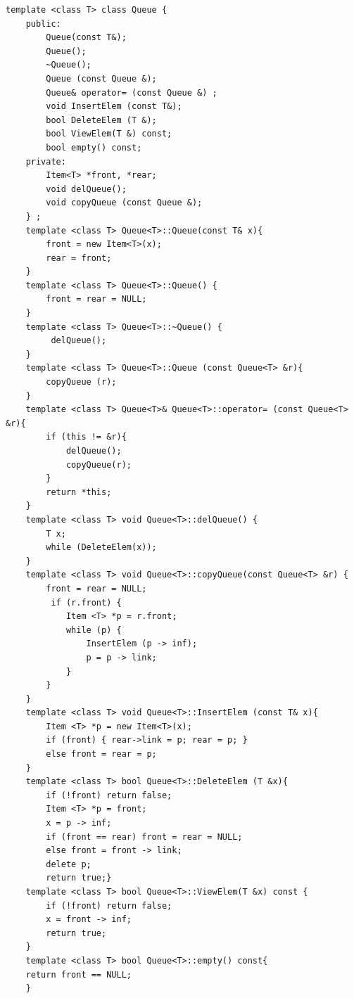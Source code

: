 \documentclass[11pt]{article} %
\begin{document}
\begin{verbatim}
template <class T> class Queue {
	public:
		Queue(const T&);
		Queue();
		~Queue();
		Queue (const Queue &);
		Queue& operator= (const Queue &) ;
		void InsertElem (const T&);
		bool DeleteElem (T &);
		bool ViewElem(T &) const;
		bool empty() const;
	private:
		Item<T> *front, *rear;
		void delQueue();
		void copyQueue (const Queue &);
	} ;
	template <class T> Queue<T>::Queue(const T& x){ 
		front = new Item<T>(x);
		rear = front;
	}
	template <class T> Queue<T>::Queue() {
		front = rear = NULL;
	}
	template <class T> Queue<T>::~Queue() {
		 delQueue();
	}	
	template <class T> Queue<T>::Queue (const Queue<T> &r){ 
		copyQueue (r); 
	}
	template <class T> Queue<T>& Queue<T>::operator= (const Queue<T> &r){ 
		if (this != &r){ 
			delQueue();
			copyQueue(r);	
		}
		return *this;
	}
	template <class T> void Queue<T>::delQueue() { 
		T x;
		while (DeleteElem(x));
	}
	template <class T> void Queue<T>::copyQueue(const Queue<T> &r) { 
		front = rear = NULL;
		 if (r.front) {
			Item <T> *p = r.front;
			while (p) { 
				InsertElem (p -> inf);
				p = p -> link;
			}
		}
	}
	template <class T> void Queue<T>::InsertElem (const T& x){ 
		Item <T> *p = new Item<T>(x);
		if (front) { rear->link = p; rear = p; }
		else front = rear = p;
	}
	template <class T> bool Queue<T>::DeleteElem (T &x){ 
		if (!front) return false;
		Item <T> *p = front;
		x = p -> inf;
		if (front == rear) front = rear = NULL;
		else front = front -> link;
		delete p;
		return true;}
	template <class T> bool Queue<T>::ViewElem(T &x) const { 
		if (!front) return false;
		x = front -> inf;
		return true;
	}
	template <class T> bool Queue<T>::empty() const{ 
	return front == NULL; 
	}
\end{verbatim}
\end{document}
